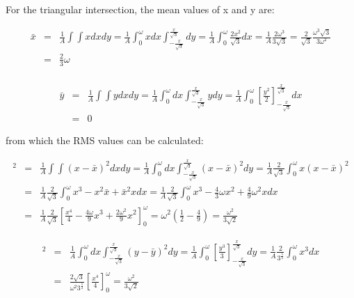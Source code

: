 For the triangular intersection, the mean values of x and y are:

\begin{eqnarray}
 \bar{x} &=& \frac{1}{A} \int \int x dx dy  = \frac{1}{A}  \int_{0}^{\omega} x dx \int_{-\frac{x}{\sqrt{3}}}^{\frac{x}{\sqrt{3}}} dy = \frac{1}{A}  \int_{0}^{\omega} \frac{2 x^{2}}{\sqrt{3}} dx = \frac{1}{A} \frac{2\omega^{3}}{3\sqrt{3}} = \frac{2}{\sqrt{3}} \frac{\omega^{3} \sqrt{3}}{3\omega^{2}} \nonumber \\
   &=& \frac{2}{3}\omega  \nonumber \\
\end{eqnarray}

\begin{eqnarray}
 \bar{y} &=& \frac{1}{A} \int \int y dx dy  = \frac{1}{A}  \int_{0}^{\omega} dx \int_{-\frac{x}{\sqrt{3}}}^{\frac{x}{\sqrt{3}}} y dy = \frac{1}{A}  \int_{0}^{\omega} \left[ \frac{y^{2}}{2} \right]_{-\frac{x}{\sqrt{3}}}^{\frac{x}{\sqrt{3}}} dx \nonumber \\
   &=& 0 %
\end{eqnarray}


from which the RMS values can be calculated:

\begin{eqnarray}
[RMS_{x}]^{2} &=& \frac{1}{A} \int \int (x-\bar{x})^{2} dx dy = \frac{1}{A} \int_{0}^{\omega} dx \int_{-\frac{x}{\sqrt{3}}}^{\frac{x}{\sqrt{3}}}  (x-\bar{x})^{2} dy = \frac{1}{A} \frac{2}{\sqrt{3}} \int_{0}^{\omega} x (x-\bar{x})^{2} \nonumber \\
   &=& \frac{1}{A} \frac{2}{\sqrt{3}} \int_{0}^{\omega} x^{3}-x^{2}\bar{x}+\bar{x}^{2}x dx = \frac{1}{A} \frac{2}{\sqrt{3}} \int_{0}^{\omega} x^{3}-\frac{4}{3}\omega x^{2}+ \frac{4}{9} \omega^{2} x dx  \nonumber \\
   &=& \frac{1}{A} \frac{2}{\sqrt{3}} \left[ \frac{x^{4}}{4} - \frac{4\omega}{9}x^{3} + \frac{2\omega^{2}}{9}x^{2}\right]_{0}^{\omega} = \omega^{2} \left(  \frac{1}{2}-\frac{4}{9} \right) = \frac{\omega^{2}}{3\sqrt{2}}
\end{eqnarray}

\begin{eqnarray}
[RMS_{y}]^{2} &=& \frac{1}{A} \int_{0}^{\omega} dx \int_{-\frac{x}{\sqrt{3}}}^{\frac{x}{\sqrt{3}}}(y-\bar{y})^{2} dy = \frac{1}{A} \int_{0}^{\omega} \left[ \frac{y^{3}}{3} \right]_{-\frac{x}{\sqrt{3}}}^{\frac{x}{\sqrt{3}}} dy =  \frac{1}{A} \frac{2}{3^{\frac{5}{2}}} \int_{0}^{\omega} x^{3}dx \nonumber \\
   &=& \frac{2\sqrt{3}}{\omega^{2}3^{\frac{5}{2}}} \left[ \frac{x^{4}}{4} \right]_{0}^{\omega} = \frac{\omega^{2}}{3\sqrt{2}} 
\end{eqnarray}

